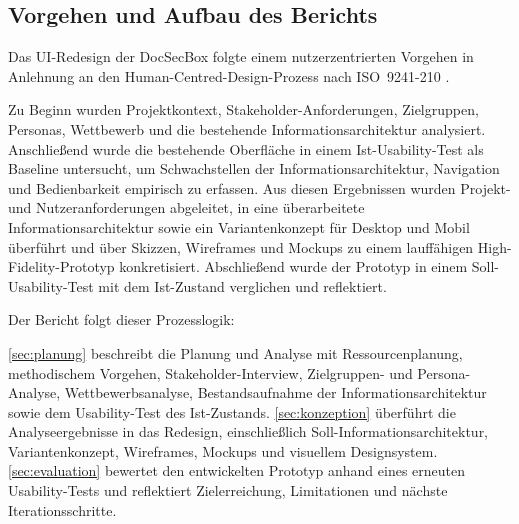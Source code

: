 \vfill
\subsection{Vorgehen und Aufbau des Berichts}\label{sec:vorgehen}

Das UI-Redesign der DocSecBox folgte einem nutzerzentrierten Vorgehen in Anlehnung an den Human-Centred-Design-Prozess nach ISO~9241-210 \parencite{iso_9241_210}.

Zu Beginn wurden Projektkontext, Stakeholder-Anforderungen, Zielgruppen, Personas, Wettbewerb und die bestehende Informationsarchitektur analysiert.
Anschließend wurde die bestehende Oberfläche in einem Ist-Usability-Test als Baseline untersucht, um Schwachstellen der Informationsarchitektur, Navigation und Bedienbarkeit empirisch zu erfassen.
Aus diesen Ergebnissen wurden Projekt- und Nutzeranforderungen abgeleitet, in eine überarbeitete Informationsarchitektur sowie ein Variantenkonzept für Desktop und Mobil überführt und über Skizzen, Wireframes und Mockups zu einem lauffähigen High-Fidelity-Prototyp konkretisiert.
Abschließend wurde der Prototyp in einem Soll-Usability-Test mit dem Ist-Zustand verglichen und reflektiert.

Der Bericht folgt dieser Prozesslogik:

\autoref{sec:planung} beschreibt die Planung und Analyse mit Ressourcenplanung, methodischem Vorgehen, Stakeholder-Interview, Zielgruppen- und Persona-Analyse, Wettbewerbsanalyse, Bestandsaufnahme der Informationsarchitektur sowie dem Usability-Test des Ist-Zustands.
\autoref{sec:konzeption} überführt die Analyseergebnisse in das Redesign, einschließlich Soll-Informationsarchitektur, Variantenkonzept, Wireframes, Mockups und visuellem Designsystem.
\autoref{sec:evaluation} bewertet den entwickelten Prototyp anhand eines erneuten Usability-Tests und reflektiert Zielerreichung, Limitationen und nächste Iterationsschritte.
